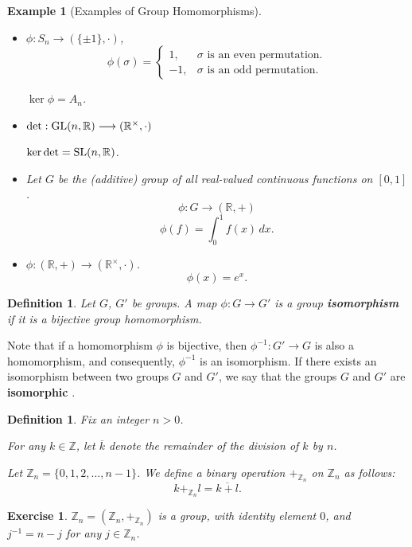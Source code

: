 \documentclass[a4paper,12pt]{report}
\newcommand{\ol}[1]{\overline{#1}}
\newcommand{\ra}{\longrightarrow}
\newcommand{\GL}{{\rm GL}}
\newcommand{\SL}{{\rm SL}}
\newcounter{statement}
\numberwithin{statement}{chapter}
\newtheorem{defn}[statement]{Definition}
\newtheorem{eg}[statement]{\bf Example}
\newtheorem{ex}[statement]{\bf Exercise}
\numberwithin{equation}{chapter}
\numberwithin{section}{chapter}
\numberwithin{subsection}{section}
\begin{document}
\begin{eg}[Examples of Group Homomorphisms]

\label{eg:grouphomomorphisms}



\begin{itemize}
\item 
$\phi: S_n \longrightarrow (\{\pm 1\}, \cdot)$,
\[\phi(\sigma) = \begin{cases} 1, & \sigma \text{ is an even permutation.}\\
-1, & \sigma \text{ is an odd permutation.}
\end{cases}\]

$\ker \phi = A_n$.


\item 
$\det: \GL(n, \mathbb{R}) \longrightarrow (\mathbb{R}^\times, \cdot)$




$\ker \det = \SL(n, \mathbb{R})$.


\item 
Let $G$ be the (additive) group of all real-valued continuous functions on $[0, 1]$.
\[\phi: G \longrightarrow (\mathbb{R}, +)\]
\[\phi(f) = \int_0^1 f(x)\,dx.\]

\item 
$\phi: (\mathbb{R}, +) \longrightarrow (\mathbb{R}^\times, \cdot)$.
\[\phi(x) = e^x.\]
\end{itemize}
\end{eg}

\begin{defn}
Let $G$, $G'$ be groups. A map $\phi: G \ra G'$ is a group  {\bf isomorphism}  if it is a bijective
group homomorphism.
\end{defn}

Note that if a homomorphism $\phi$ is bijective, then $\phi^{-1}: G' \ra G$ is also a homomorphism,
and consequently, $\phi^{-1}$ is an isomorphism.
If there exists an isomorphism between two groups $G$ and $G'$,
we say that the groups $G$ and $G'$ are  {\bf isomorphic} .

\begin{defn}
Fix an integer $n > 0$.



For any $k \in \mathbb{Z}$, let $\ol{k}$ denote the remainder of the division of $k$
by $n$.



Let $\mathbb{Z}_n = \{0, 1, 2, \ldots, n - 1\}$.
We define a binary operation $+_{\mathbb{Z}_n}$
on $\mathbb{Z}_n$ as follows:
\[k +_{\mathbb{Z}_n} l = \ol{k + l}.\]
\end{defn}
\begin{ex}

$\mathbb{Z}_n = (\mathbb{Z}_n, +_{\mathbb{Z}_n})$
is a group, with identity element $0$, and $j^{-1} = n - j$ for any $j \in \mathbb{Z}_n$.

\end{ex}
\end{document}
